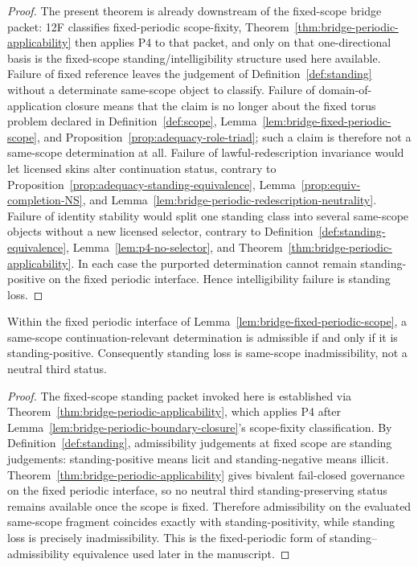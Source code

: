 \begin{proof}
The present theorem is already downstream of the fixed-scope bridge packet: 12F classifies fixed-periodic scope-fixity, Theorem~\ref{thm:bridge-periodic-applicability} then applies P4 to that packet, and only on that one-directional basis is the fixed-scope standing/intelligibility structure used here available. Failure of fixed reference leaves the judgement of Definition~\ref{def:standing} without a determinate same-scope object to classify. Failure of domain-of-application closure means that the claim is no longer about the fixed torus problem declared in Definition~\ref{def:scope}, Lemma~\ref{lem:bridge-fixed-periodic-scope}, and Proposition~\ref{prop:adequacy-role-triad}; such a claim is therefore not a same-scope determination at all. Failure of lawful-redescription invariance would let licensed skins alter continuation status, contrary to Proposition~\ref{prop:adequacy-standing-equivalence}, Lemma~\ref{prop:equiv-completion-NS}, and Lemma~\ref{lem:bridge-periodic-redescription-neutrality}. Failure of identity stability would split one standing class into several same-scope objects without a new licensed selector, contrary to Definition~\ref{def:standing-equivalence}, Lemma~\ref{lem:p4-no-selector}, and Theorem~\ref{thm:bridge-periodic-applicability}. In each case the purported determination cannot remain standing-positive on the fixed periodic interface. Hence intelligibility failure is standing loss.
\end{proof}

\begin{manualtheorem}
\label{thm:st3-standing-admissibility-equivalence}
Within the fixed periodic interface of Lemma~\ref{lem:bridge-fixed-periodic-scope}, a same-scope continuation-relevant determination is admissible if and only if it is standing-positive. Consequently standing loss is same-scope inadmissibility, not a neutral third status.
\end{manualtheorem}

\begin{proof}
The fixed-scope standing packet invoked here is established via Theorem~\ref{thm:bridge-periodic-applicability}, which applies P4 after Lemma~\ref{lem:bridge-periodic-boundary-closure}'s scope-fixity classification. By Definition~\ref{def:standing}, admissibility judgements at fixed scope are standing judgements: standing-positive means licit and standing-negative means illicit. Theorem~\ref{thm:bridge-periodic-applicability} gives bivalent fail-closed governance on the fixed periodic interface, so no neutral third standing-preserving status remains available once the scope is fixed. Therefore admissibility on the evaluated same-scope fragment coincides exactly with standing-positivity, while standing loss is precisely inadmissibility. This is the fixed-periodic form of standing--admissibility equivalence used later in the manuscript.
\end{proof}

